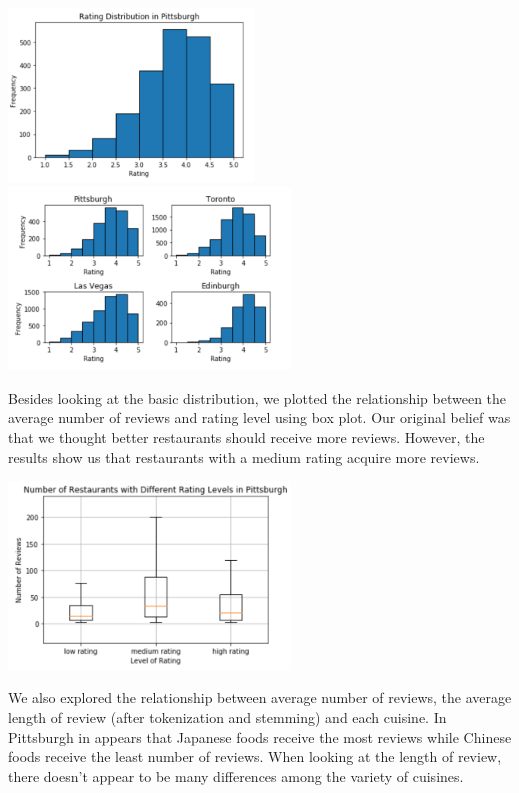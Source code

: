 \documentclass{neu_handout}
\begin{document}
\begin{center}
	\includegraphics[width=65mm,scale=0.3]{rating_distribution_in_Pittsburgh}
	\includegraphics[width=75mm,scale=0.3]{rating_distribution_vs_countries}
\end{center}

Besides looking at the basic distribution, we plotted the relationship between the average number of reviews and rating level using box plot. Our original belief was that we thought better restaurants should receive more reviews. However, the results show us that restaurants with a medium rating acquire more reviews. 

\begin{center}
	\includegraphics[width=75mm,scale=0.3]{number_of_restaurants_vs_rating_level}
\end{center}

We also explored the relationship between average number of reviews, the average length of review (after tokenization and stemming) and each cuisine. In Pittsburgh in appears that Japanese foods receive the most reviews while Chinese foods receive the least number of reviews. When looking at the length of review, there doesn't appear to be many differences among the variety of cuisines. 
\end{document}
